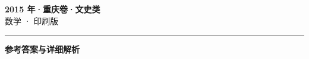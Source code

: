 \documentclass[zihao=5, a4paper]{ctexart}
\begin{document}
\begin{center}
  {\Large\bfseries 2015 年·重庆卷·文史类}\\[4pt]
  {\large 数学 · 印刷版}
\end{center}
\medskip
{}

\par\bigskip\hrule\bigskip
{}
\begin{center}{\large\bfseries 参考答案与详细解析}\end{center}
\smallskip

\end{document}
